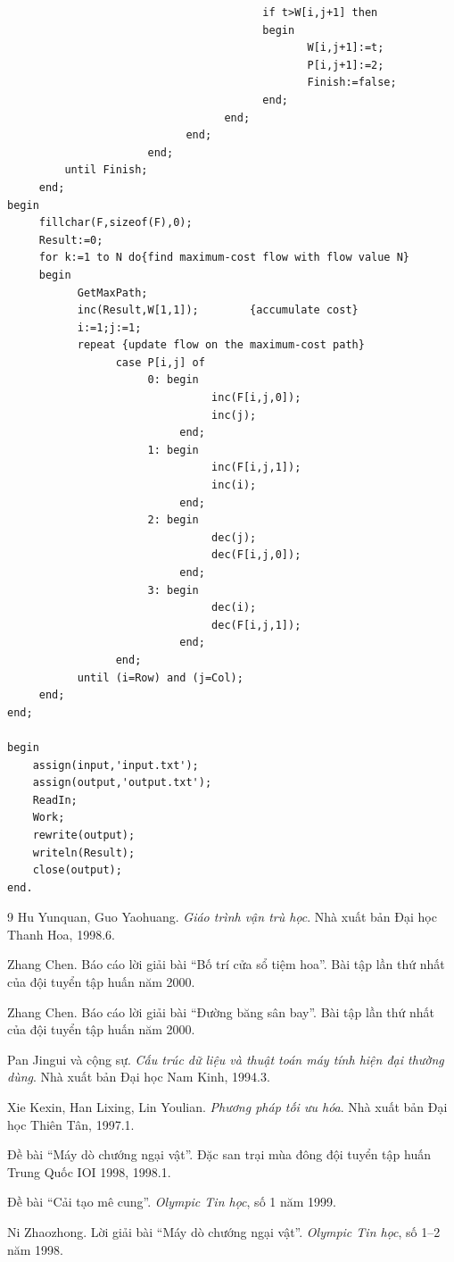 \documentclass[11pt]{article}
\begin{document}
\begin{verbatim}
                                        if t>W[i,j+1] then
                                        begin
                                               W[i,j+1]:=t;
                                               P[i,j+1]:=2;
                                               Finish:=false;
                                        end;
                                  end;
                            end;
                      end;
         until Finish;
     end;
begin
     fillchar(F,sizeof(F),0);
     Result:=0;
     for k:=1 to N do{find maximum-cost flow with flow value N}
     begin
           GetMaxPath;
           inc(Result,W[1,1]);        {accumulate cost}
           i:=1;j:=1;
           repeat {update flow on the maximum-cost path}
                 case P[i,j] of
                      0: begin
                                inc(F[i,j,0]);
                                inc(j);
                           end;
                      1: begin
                                inc(F[i,j,1]);
                                inc(i);
                           end;
                      2: begin
                                dec(j);
                                dec(F[i,j,0]);
                           end;
                      3: begin
                                dec(i);
                                dec(F[i,j,1]);
                           end;
                 end;
           until (i=Row) and (j=Col);
     end;
end;

begin
    assign(input,'input.txt');
    assign(output,'output.txt');
    ReadIn;
    Work;
    rewrite(output);
    writeln(Result);
    close(output);
end.
\end{verbatim}

\begin{thebibliography}{9}
Hu Yunquan, Guo Yaohuang.
\newblock \textit{Giáo trình vận trù học}.
\newblock Nhà xuất bản Đại học Thanh Hoa, 1998.6.

Zhang Chen.
\newblock Báo cáo lời giải bài ``Bố trí cửa sổ tiệm hoa''.
\newblock Bài tập lần thứ nhất của đội tuyển tập huấn năm 2000.

Zhang Chen.
\newblock Báo cáo lời giải bài ``Đường băng sân bay''.
\newblock Bài tập lần thứ nhất của đội tuyển tập huấn năm 2000.

Pan Jingui và cộng sự.
\newblock \textit{Cấu trúc dữ liệu và thuật toán máy tính hiện đại thường dùng}.
\newblock Nhà xuất bản Đại học Nam Kinh, 1994.3.

Xie Kexin, Han Lixing, Lin Youlian.
\newblock \textit{Phương pháp tối ưu hóa}.
\newblock Nhà xuất bản Đại học Thiên Tân, 1997.1.

Đề bài ``Máy dò chướng ngại vật''.
\newblock Đặc san trại mùa đông đội tuyển tập huấn Trung Quốc IOI 1998, 1998.1.

Đề bài ``Cải tạo mê cung''.
\newblock \textit{Olympic Tin học}, số 1 năm 1999.

Ni Zhaozhong.
\newblock Lời giải bài ``Máy dò chướng ngại vật''.
\newblock \textit{Olympic Tin học}, số 1--2 năm 1998.
\end{thebibliography}
\end{document}
